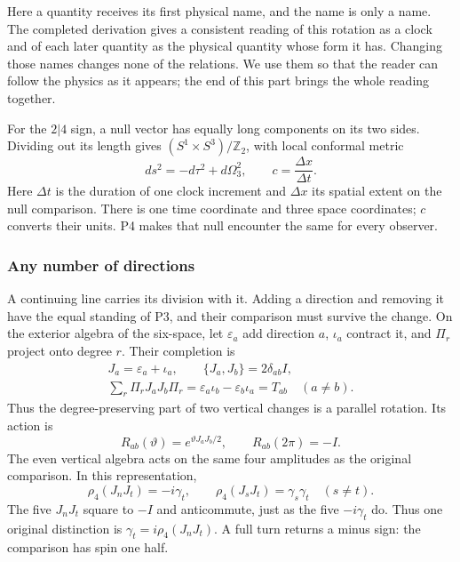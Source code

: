 \documentclass[aps,prx,reprint,longbibliography]{revtex4-2}
\begin{document}
Here a quantity receives its first physical name, and the name is only a name. The completed derivation gives a consistent reading of this rotation as a clock and of each later quantity as the physical quantity whose form it has. Changing those names changes none of the relations. We use them so that the reader can follow the physics as it appears; the end of this part brings the whole reading together.

For the $2|4$ sign, a null vector has equally long components on its two sides. Dividing out its length gives $(S^1\times S^3)/\mathbb Z_2$, with local conformal metric
\begin{equation}
 ds^2=-d\tau^2+d\Omega_3^2,\qquad
 c=\frac{\Delta x}{\Delta t}.
 \label{eq:spacetime}
\end{equation}
Here $\Delta t$ is the duration of one clock increment and $\Delta x$ its spatial extent on the null comparison. There is one time coordinate and three space coordinates; $c$ converts their units. P4 makes that null encounter the same for every observer.

\subsubsection{Any number of directions}
\label{sec:all_directions}

A continuing line carries its division with it. Adding a direction and removing it have the equal standing of P3, and their comparison must survive the change. On the exterior algebra of the six-space, let $\varepsilon_a$ add direction $a$, $\iota_a$ contract it, and $\Pi_r$ project onto degree $r$. Their completion is
\begin{equation}
 \begin{gathered}
 J_a=\varepsilon_a+\iota_a,\qquad\{J_a,J_b\}=2\delta_{ab}I,\\
 \sum_r\Pi_rJ_aJ_b\Pi_r
 =\varepsilon_a\iota_b-\varepsilon_b\iota_a=T_{ab}\quad(a\ne b).
 \end{gathered}
 \label{eq:vertical}
\end{equation}
Thus the degree-preserving part of two vertical changes is a parallel rotation. Its action is
\begin{equation}
 R_{ab}(\vartheta)=e^{\vartheta J_aJ_b/2},\qquad R_{ab}(2\pi)=-I.
 \label{eq:spin}
\end{equation}
The even vertical algebra acts on the same four amplitudes as the original comparison. In this representation,
\begin{equation}
 \rho_4(J_nJ_t)=-i\gamma_t,\qquad
 \rho_4(J_sJ_t)=\gamma_s\gamma_t\quad(s\ne t).
 \label{eq:vertical_four}
\end{equation}
The five $J_nJ_t$ square to $-I$ and anticommute, just as the five $-i\gamma_t$ do. Thus one original distinction is $\gamma_t=i\rho_4(J_nJ_t)$. A full turn returns a minus sign: the comparison has spin one half.
\end{document}
